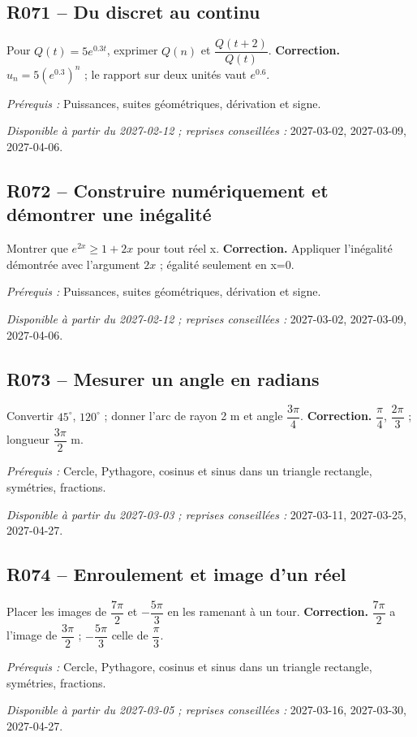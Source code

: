 \subsection*{R071 -- Du discret au continu}\label{R071}
Pour $Q(t)=5e^{\num{0,3}t}$, exprimer $Q(n)$ et $\dfrac{Q(t+2)}{Q(t)}$.
\ifmxteacher\textbf{Correction.} $u_n=5(e^{\num{0,3}})^n$ ; le rapport sur deux unités vaut $e^{\num{0,6}}$.\par\textit{Prérequis :} Puissances, suites géométriques, dérivation et signe.\par\textit{Disponible à partir du 2027-02-12 ; reprises conseillées :} 2027-03-02, 2027-03-09, 2027-04-06.\fi
{}\subsection*{R072 -- Construire numériquement et démontrer une inégalité}\label{R072}
Montrer que $e^{2x}\geq1+2x$ pour tout réel x.
\ifmxteacher\textbf{Correction.} Appliquer l’inégalité démontrée avec l’argument $2x$ ; égalité seulement en x=0.\par\textit{Prérequis :} Puissances, suites géométriques, dérivation et signe.\par\textit{Disponible à partir du 2027-02-12 ; reprises conseillées :} 2027-03-02, 2027-03-09, 2027-04-06.\fi
{}\subsection*{R073 -- Mesurer un angle en radians}\label{R073}
Convertir $45^\circ$, $120^\circ$ ; donner l’arc de rayon 2 m et angle $\dfrac{3\pi}{4}$.
\ifmxteacher\textbf{Correction.} $\dfrac{\pi}{4}$, $\dfrac{2\pi}{3}$ ; longueur $\dfrac{3\pi}{2}$ m.\par\textit{Prérequis :} Cercle, Pythagore, cosinus et sinus dans un triangle rectangle, symétries, fractions.\par\textit{Disponible à partir du 2027-03-03 ; reprises conseillées :} 2027-03-11, 2027-03-25, 2027-04-27.\fi
{}\subsection*{R074 -- Enroulement et image d’un réel}\label{R074}
Placer les images de $\dfrac{7\pi}{2}$ et $-\dfrac{5\pi}{3}$ en les ramenant à un tour.
\ifmxteacher\textbf{Correction.} $\dfrac{7\pi}{2}$ a l’image de $\dfrac{3\pi}{2}$ ; $-\dfrac{5\pi}{3}$ celle de $\dfrac{\pi}{3}$.\par\textit{Prérequis :} Cercle, Pythagore, cosinus et sinus dans un triangle rectangle, symétries, fractions.\par\textit{Disponible à partir du 2027-03-05 ; reprises conseillées :} 2027-03-16, 2027-03-30, 2027-04-27.\fi
